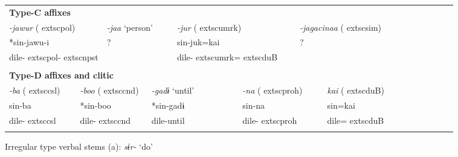 \begin{tabularx}{\textwidth}{XXXXXXXXXXXXXXXXXXXXXX}
\multicolumn{22}{X}{{\bfseries Type-C affixes}}\\
\multicolumn{4}{X}{{ \textit{{}-jawur} (	extsc{pol})}} & \multicolumn{3}{X}{{ \textit{{}-jaa} ‘person’}} & \multicolumn{3}{X}{{ \textit{{}-jur} (	extsc{umrk})}} & \multicolumn{4}{X}{{ \textit{{}-jagacinaa} (	extsc{sim})}} & \multicolumn{8}{X}{}\\
\multicolumn{4}{X}{{ *sin-jawu-i}} & \multicolumn{3}{X}{{ ?}} & \multicolumn{3}{X}{sin-juk=kai} & \multicolumn{4}{X}{{ ?}} & \multicolumn{8}{X}{}\\
\multicolumn{4}{X}{dile-	extsc{pol}-	extsc{npst}} & \multicolumn{3}{X}{} & \multicolumn{3}{X}{dile-	extsc{umrk}=	extsc{du}B} & \multicolumn{4}{X}{} & \multicolumn{8}{X}{}\\
\multicolumn{22}{X}{}\\
\multicolumn{22}{X}{{\bfseries Type-D affixes and clitic}}\\
\multicolumn{3}{X}{{ \textit{{}-ba} (	extsc{csl})}} & \multicolumn{3}{X}{{ \textit{{}-boo} (	extsc{cnd})}} & \multicolumn{2}{X}{{ \textit{{}-gadɨ} ‘until’}} & \multicolumn{3}{X}{{ \textit{{}-na} (	extsc{proh})}} & \multicolumn{5}{X}{{ \textit{kai} (	extsc{du}B)}} & \multicolumn{6}{X}{}\\
\multicolumn{3}{X}{{ sin-ba}} & \multicolumn{3}{X}{{ *sin-boo}} & \multicolumn{2}{X}{{ *sin-gadɨ}} & \multicolumn{3}{X}{{ sin-na}} & \multicolumn{5}{X}{{ sin=kai}} & \multicolumn{6}{X}{}\\
\multicolumn{3}{X}{dile-	extsc{csl}} & \multicolumn{3}{X}{dile-	extsc{cnd}} & \multicolumn{2}{X}{dile-until} & \multicolumn{3}{X}{dile-	extsc{proh}} & \multicolumn{5}{X}{dile=	extsc{du}B} & \multicolumn{6}{X}{}\\
\lspbottomrule
\end{tabularx}
Irregular type verbal stems (a): \textit{sɨr-} ‘do’

\tablefirsthead{}

